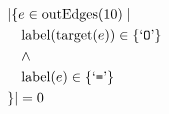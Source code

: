 \begin{align*}
&|\{e \in \mathrm{outEdges}(10)  \mid \\
&\quad \mathrm{label}(\mathrm{target}(e)) \in \{ \text{`\texttt{O}'} \}\\
&\quad \wedge\\
&\quad \mathrm{label}(e) \in \{ \text{`\texttt{=}'} \}\\
&\}| = 0
\end{align*}

